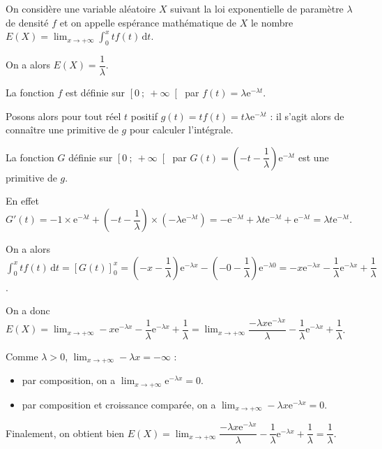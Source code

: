 \documentclass{cornouaille}
\begin{document}
\begin{propriete}
On considère une variable aléatoire $X$ suivant la loi exponentielle de paramètre $\lambda$ de densité $f$ et on appelle espérance mathématique de $X$ le nombre $E(X)=\displaystyle \lim_{x \rightarrow +\infty} \int_{0}^{x} tf(t) \, \textrm{d}t$.

On a alors $E(X)=\dfrac{1}{\lambda}$.
\end{propriete}

\begin{preuve}
La fonction $f$ est définie sur $\left[0\ ;\ +\infty \right[$ par $f(t)=\lambda\textrm{e}^{-\lambda t}$.

Posons alors pour tout réel $t$ positif $g(t)=tf(t)=t\lambda\textrm{e}^{-\lambda t}$ : il s'agit alors de connaître une primitive de $g$ pour calculer l'intégrale.

La fonction $G$ définie sur $\left[0\ ;\ +\infty \right[$  par $G(t)=\left(-t-\dfrac{1}{\lambda}\right)\textrm{e}^{-\lambda t}$ est une primitive de $g$.

En effet $G'(t)=-1\times \textrm{e}^{-\lambda t} + \left(-t-\dfrac{1}{\lambda}\right)\times \left(-\lambda \textrm{e}^{-\lambda t}\right)=-\textrm{e}^{-\lambda t} + \lambda t \textrm{e}^{-\lambda t} + \textrm{e}^{-\lambda t} = \lambda t \textrm{e}^{-\lambda t}$.

On a alors ${\displaystyle\int_{0}^{x} tf(t) \, \textrm{d}t = \left[G(t)\right]_0^x=\left(-x-\dfrac{1}{\lambda}\right)\textrm{e}^{-\lambda x}-\left(-0-\dfrac{1}{\lambda}\right)\textrm{e}^{-\lambda 0}=-x\textrm{e}^{-\lambda x}-\dfrac{1}{\lambda}\textrm{e}^{-\lambda x}+\dfrac{1}{\lambda}}$.

On a donc $E(X) = \displaystyle \lim_{x \rightarrow +\infty} -x\textrm{e}^{-\lambda x}-\dfrac{1}{\lambda}\textrm{e}^{-\lambda x}+\dfrac{1}{\lambda}=\displaystyle \lim_{x \rightarrow +\infty} \dfrac{-\lambda x\textrm{e}^{-\lambda x}}{\lambda}-\dfrac{1}{\lambda}\textrm{e}^{-\lambda x}+\dfrac{1}{\lambda}$.

Comme $\lambda>0$, $\displaystyle \lim_{x \rightarrow +\infty} -\lambda x=-\infty$  :
\begin{itemize}
\item par composition, on a $\displaystyle \lim_{x \rightarrow +\infty} \textrm{e}^{-\lambda x}=0$.
\item par composition et croissance comparée, on a $\displaystyle \lim_{x \rightarrow +\infty} -\lambda x \textrm{e}^{-\lambda x}=0$.
\end{itemize}
Finalement, on obtient bien $E(X) = \displaystyle \lim_{x \rightarrow +\infty} \dfrac{-\lambda x\textrm{e}^{-\lambda x}}{\lambda}-\dfrac{1}{\lambda}\textrm{e}^{-\lambda x}+\dfrac{1}{\lambda}=\dfrac{1}{\lambda}$.

\end{preuve}
\end{document}
